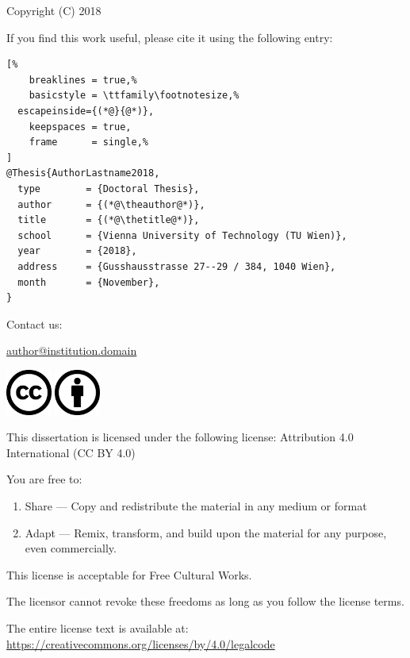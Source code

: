 Copyright (C) 2018 \theauthor

If you find this work useful, please cite it using the following \BibTeX{ } entry:

\vspace{1em}

\begin{lstlisting}[%
	breaklines = true,%
	basicstyle = \ttfamily\footnotesize,%
  escapeinside={(*@}{@*)},
	keepspaces = true,
	frame      = single,%
]
@Thesis{AuthorLastname2018,
  type        = {Doctoral Thesis},
  author      = {(*@\theauthor@*)},
  title       = {(*@\thetitle@*)},
  school      = {Vienna University of Technology (TU Wien)},
  year        = {2018},
  address     = {Gusshausstrasse 27--29 / 384, 1040 Wien},
  month       = {November},
}
\end{lstlisting}

\vspace{3em}
Contact us:

\href{E-mail address}{author@institution.domain}

\vfill

\includegraphics[height=1.5cm]{fig/cc-large.png}
\includegraphics[height=1.5cm]{fig/by-large.png}


This dissertation is licensed under the following license:
Attribution 4.0 International (CC BY 4.0)

\vspace{3em}

You are free to:

\begin{enumerate}
    \item Share --- Copy and redistribute the material in any medium or format
    \item Adapt --- Remix, transform, and build upon the material for any purpose,
			even commercially.
\end{enumerate}

This license is acceptable for Free Cultural Works.

The licensor cannot revoke these freedoms as long as you follow the license terms.

The entire license text is available at:
\href{https://creativecommons.org/licenses/by/4.0/legalcode}
	{https://creativecommons.org/licenses/by/4.0/legalcode}


